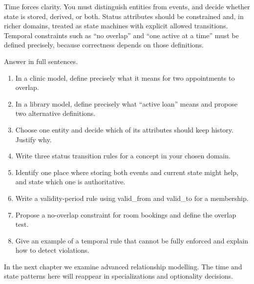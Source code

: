\begin{chaptersummary}
Time forces clarity.
You must distinguish entities from events, and decide whether state is stored, derived, or both.
Status attributes should be constrained and, in richer domains, treated as state machines with explicit allowed transitions.
Temporal constraints such as “no overlap” and “one active at a time” must be defined precisely, because correctness depends on those definitions.
\end{chaptersummary}

\begin{exercisebox}
Answer in full sentences.
\begin{enumerate}[label=\arabic*.]
  \item In a clinic model, define precisely what it means for two appointments to overlap.
  \item In a library model, define precisely what “active loan” means and propose two alternative definitions.
  \item Choose one entity and decide which of its attributes should keep history. Justify why.
  \item Write three status transition rules for a concept in your chosen domain.
  \item Identify one place where storing both events and current state might help, and state which one is authoritative.
  \item Write a validity-period rule using valid\_from and valid\_to for a membership.
  \item Propose a no-overlap constraint for room bookings and define the overlap test.
  \item Give an example of a temporal rule that cannot be fully enforced and explain how to detect violations.
\end{enumerate}
\end{exercisebox}

In the next chapter we examine advanced relationship modelling.
The time and state patterns here will reappear in specializations and optionality decisions.
